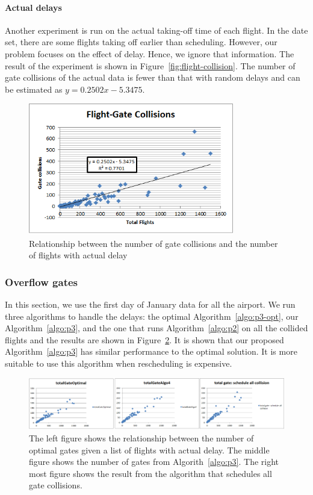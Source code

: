 \documentclass[11pt,a4paper]{article}
\begin{document}
\paragraph{Actual delays} Another experiment is run on the actual taking-off time of each flight. In the date set, there are some flights taking off earlier than scheduling. However, our problem focuses on the effect of delay. Hence, we ignore that information. The result of the experiment is shown in Figure~\ref{fig:flight-collision}. The number of gate collisions of the actual data is fewer than that with random delays and can be estimated as $y = 0.2502x-5.3475$. \par
\begin{figure}
    \centering
    \includegraphics[width=0.8\textwidth]{img-flight-collision.png}
    \caption{Relationship between the number of gate collisions and the number of flights with actual delay}
    \label{fig:gate-flight-collision}
\end{figure}

\subsubsection{Overflow gates}
In this section, we use the first day of January data for all the airport. We run three algorithms to handle the delays: the optimal Algorithm~\ref{algo:p3-opt}, our Algorithm~\ref{algo:p3}, and the one that runs Algorithm~\ref{algo:p2} on all the collided flights and the results are shown in Figure~\ref{fig:overflow}. It is shown that our proposed Algorithm~\ref{algo:p3} has similar performance to the optimal solution. It is more suitable to use this algorithm when rescheduling is expensive.
\begin{figure}
    \centering
    \includegraphics[width=1.2\textwidth]{img-overflow.png}
    \caption{The left figure shows the relationship between the number of optimal gates given a list of flights with actual delay. The middle figure shows the number of gates from Algorith~\ref{algo:p3}. The right most figure shows the result from the algorithm that schedules all gate collisions.}
    \label{fig:overflow}
\end{figure}
\end{document}
